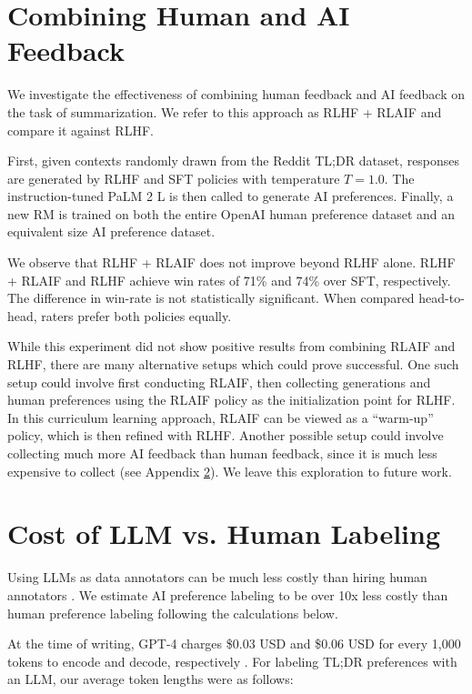 \documentclass[11pt]{article}
\begin{document}
\section{Combining Human and AI Feedback}
\label{sec:rlhf_p_rlaif}
We investigate the effectiveness of combining human feedback and AI feedback on the task of summarization. We refer to this approach as RLHF + RLAIF and compare it against RLHF. 

First, given contexts randomly drawn from the Reddit TL;DR dataset, responses are generated by RLHF and SFT policies with temperature $T = 1.0$. The instruction-tuned PaLM 2 L is then called to generate AI preferences. Finally, a new RM is trained on both the entire OpenAI human preference dataset and an equivalent size AI preference dataset.

We observe that RLHF + RLAIF does not improve beyond RLHF alone. RLHF + RLAIF and RLHF achieve win rates of 71\% and 74\% over SFT, respectively. The difference in win-rate is not statistically significant.
When compared head-to-head, raters prefer both policies equally.

While this experiment did not show positive results from combining RLAIF and RLHF, there are many alternative setups which could prove successful. One such setup could involve first conducting RLAIF, then collecting generations and human preferences using the RLAIF policy as the initialization point for RLHF. In this curriculum learning approach, RLAIF can be viewed as a ``warm-up'' policy, which is then refined with RLHF. Another possible setup could involve collecting much more AI feedback than human feedback, since it is much less expensive to collect (see Appendix \ref{sec:llm_vs_human_cost_comparison}). We leave this exploration to future work.

\section{Cost of LLM vs. Human Labeling}
\label{sec:llm_vs_human_cost_comparison}

Using LLMs as data annotators can be much less costly than hiring human annotators \citep{wang2021want}. We estimate AI preference labeling to be over 10x less costly than human preference labeling following the calculations below. 

At the time of writing, GPT-4 charges \$0.03 USD and \$0.06 USD for every 1,000 tokens to encode and decode, respectively \citep{openaipricing}. For labeling TL;DR preferences with an LLM, our average token lengths were as follows:
\end{document}
